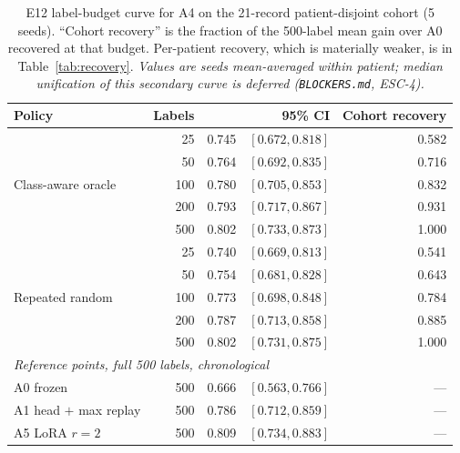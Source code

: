 \begin{table}[H]
\centering
\small
\caption{E12 label-budget curve for A4 on the 21-record patient-disjoint cohort
(5 seeds). ``Cohort recovery'' is the fraction of the 500-label mean gain over A0
recovered at that budget. Per-patient recovery, which is materially weaker, is in
Table~\ref{tab:recovery}. \emph{Values are seeds mean-averaged within patient;
median unification of this secondary curve is deferred (\texttt{BLOCKERS.md},
ESC-4).}}
\label{tab:e12_label_curve}
\begin{tabular}{lrrrr}
\toprule
Policy & Labels & \macrof{} & 95\% CI & Cohort recovery \\
\midrule
\multirow{5}{*}{Class-aware oracle}
 & 25  & 0.745 & $[0.672,0.818]$ & 0.582 \\
 & 50  & 0.764 & $[0.692,0.835]$ & 0.716 \\
 & 100 & 0.780 & $[0.705,0.853]$ & 0.832 \\
 & 200 & 0.793 & $[0.717,0.867]$ & 0.931 \\
 & 500 & 0.802 & $[0.733,0.873]$ & 1.000 \\
\midrule
\multirow{5}{*}{Repeated random}
 & 25  & 0.740 & $[0.669,0.813]$ & 0.541 \\
 & 50  & 0.754 & $[0.681,0.828]$ & 0.643 \\
 & 100 & 0.773 & $[0.698,0.848]$ & 0.784 \\
 & 200 & 0.787 & $[0.713,0.858]$ & 0.885 \\
 & 500 & 0.802 & $[0.731,0.875]$ & 1.000 \\
\midrule
\multicolumn{5}{l}{\emph{Reference points, full 500 labels, chronological}} \\
 A0 frozen & 500 & 0.666 & $[0.563,0.766]$ & --- \\
 A1 head $+$ max replay & 500 & 0.786 & $[0.712,0.859]$ & --- \\
 A5 LoRA $r{=}2$ & 500 & 0.809 & $[0.734,0.883]$ & --- \\
\bottomrule
\end{tabular}
\end{table}
